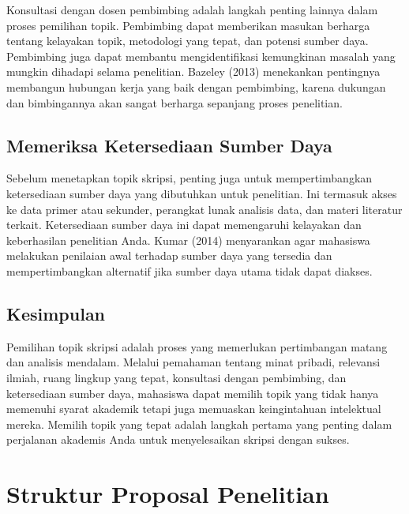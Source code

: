 \documentclass[
  indonesian,
  letterpaper,
]{scrbook}
\begin{document}
Konsultasi dengan dosen pembimbing adalah langkah penting lainnya dalam
proses pemilihan topik. Pembimbing dapat memberikan masukan berharga
tentang kelayakan topik, metodologi yang tepat, dan potensi sumber daya.
Pembimbing juga dapat membantu mengidentifikasi kemungkinan masalah yang
mungkin dihadapi selama penelitian. Bazeley (2013) menekankan pentingnya
membangun hubungan kerja yang baik dengan pembimbing, karena dukungan
dan bimbingannya akan sangat berharga sepanjang proses penelitian.

\section{Memeriksa Ketersediaan Sumber
Daya}\label{memeriksa-ketersediaan-sumber-daya}

Sebelum menetapkan topik skripsi, penting juga untuk mempertimbangkan
ketersediaan sumber daya yang dibutuhkan untuk penelitian. Ini termasuk
akses ke data primer atau sekunder, perangkat lunak analisis data, dan
materi literatur terkait. Ketersediaan sumber daya ini dapat memengaruhi
kelayakan dan keberhasilan penelitian Anda. Kumar (2014) menyarankan
agar mahasiswa melakukan penilaian awal terhadap sumber daya yang
tersedia dan mempertimbangkan alternatif jika sumber daya utama tidak
dapat diakses.

\section*{Kesimpulan}\label{kesimpulan-1}


Pemilihan topik skripsi adalah proses yang memerlukan pertimbangan
matang dan analisis mendalam. Melalui pemahaman tentang minat pribadi,
relevansi ilmiah, ruang lingkup yang tepat, konsultasi dengan
pembimbing, dan ketersediaan sumber daya, mahasiswa dapat memilih topik
yang tidak hanya memenuhi syarat akademik tetapi juga memuaskan
keingintahuan intelektual mereka. Memilih topik yang tepat adalah
langkah pertama yang penting dalam perjalanan akademis Anda untuk
menyelesaikan skripsi dengan sukses.


\chapter{Struktur Proposal
Penelitian}\label{struktur-proposal-penelitian}
\end{document}

